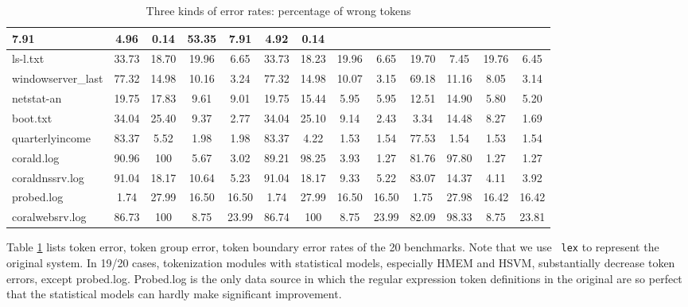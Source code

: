 \begin{table}
\begin{center}
\begin{tabular}{|l||c|c|c|c||c|c|c|c||c|c|c|c|}
7.91
                     & 4.96  & 0.14  & 53.35 & 7.91     & 4.92  & 0.14  \\ \hline
ls-l.txt                   & 33.73 & 18.70 & 19.96 & 6.65  & 33.73 &
               18.23 & 19.96 & 6.65  & 19.70 & 7.45  & 19.76 & 6.45  \\ \hline
windowserver\_last     & 77.32 & 14.98 & 10.16 & 3.24  & 77.32 &
               14.98 & 10.07 & 3.15  & 69.18 & 11.16 & 8.05  & 3.14  \\ \hline
netstat-an                 & 19.75 & 17.83 & 9.61  & 9.01  & 19.75 &
               15.44 & 5.95  & 5.95  & 12.51 & 14.90 & 5.80  & 5.20  \\ \hline
boot.txt                   & 34.04 & 25.40 & 9.37  & 2.77  & 34.04 &
               25.10 & 9.14  & 2.43  & 3.34  & 14.48 & 8.27  & 1.69  \\ \hline
quarterlyincome    & 83.37 & 5.52  & 1.98  & 1.98     & 83.37 &
               4.22  & 1.53  & 1.54     & 77.53 & 1.54  & 1.53  & 1.54     \\ \hline
corald.log            & 90.96 & 100   & 5.67  & 3.02     & 89.21 &
               98.25 & 3.93  & 1.27     & 81.76 & 97.80 & 1.27  & 1.27     \\ \hline
coraldnssrv.log       & 91.04 & 18.17 & 10.64 & 5.23  & 91.04 &
               18.17 & 9.33  & 5.22  & 83.07 & 14.37 & 4.11  & 3.92  \\ \hline
probed.log            & 1.74  & 27.99 & 16.50 & 16.50 & 1.74  &
               27.99 & 16.50 & 16.50 & 1.75  & 27.98 & 16.42 & 16.42 \\ \hline
coralwebsrv.log       & 86.73 & 100   & 8.75  & 23.99 & 86.74 &
               100   & 8.75  & 23.99     & 82.09 & 98.33 & 8.75  & 23.81     \\
               \hline
\end{tabular}
\caption{Three kinds of error rates: percentage of wrong tokens}
\label{tab:error}
\end{center}
\end{table}

Table \ref{tab:error} lists token error, token group error, token
boundary error rates of the 20 benchmarks. Note that we use {\tt
lex} to represent the original \learnpads{} system. In 19/20 cases,
tokenization modules with statistical models, especially HMEM and
HSVM, substantially decrease token errors, except probed.log.
Probed.log is the only data source in which the regular expression
token definitions in the original \learnpads{} are so perfect that
the statistical models can hardly make significant improvement.

